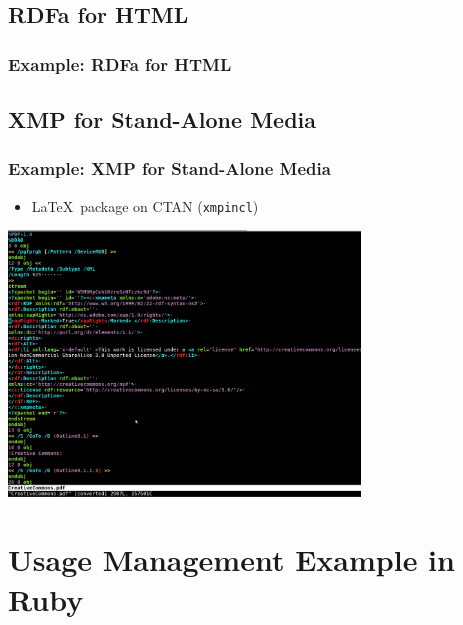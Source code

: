 \documentclass[mathserif,xcolor=dvipsnames,hyperref={bookmarks=true}]{beamer}
\begin{document}
    \subsection{RDFa for HTML}
\begin{frame}[fragile]
\frametitle{Example: RDFa for HTML}

\end{frame}

    \subsection{XMP for Stand-Alone Media}
    \begin{frame}[t]
        \frametitle{Example: XMP for Stand-Alone Media}
        \begin{itemize}
            \item \LaTeX\ package on CTAN (\texttt{xmpincl})
        \end{itemize}
        \begin{center}
            \includegraphics[width=0.7\textwidth]{figures/embedded_xmp.png}
        \end{center}
    \end{frame}

\section{Usage Management Example in Ruby}
\begin{frame}[t]
\end{frame}
\end{document}
